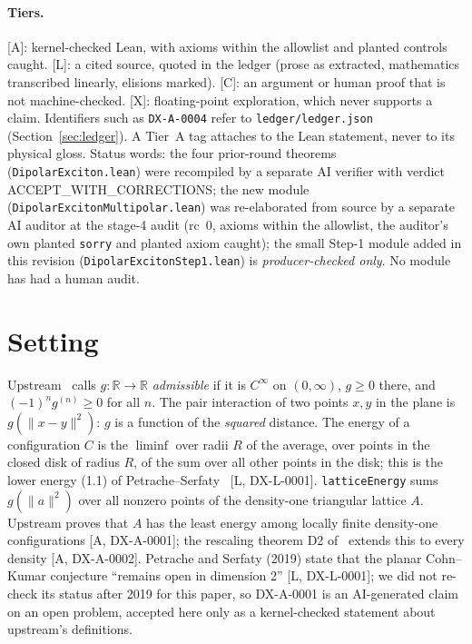 \documentclass[11pt]{article}
\theoremstyle{remark}
\newcommand{\R}{\mathbb{R}}
\newcommand{\tier}[1]{\textsf{[#1]}}
\newcommand{\lean}[1]{\texttt{#1}}
\begin{document}
\paragraph{Tiers.} \tier{A}: kernel-checked Lean, with axioms within the allowlist and planted controls caught.
\tier{L}: a cited source, quoted in the ledger (prose as extracted, mathematics transcribed linearly, elisions
marked). \tier{C}: an argument or human proof that is not
machine-checked. \tier{X}: floating-point exploration, which never supports a claim. Identifiers such as
\texttt{DX-A-0004} refer to \texttt{ledger/ledger.json} (Section~\ref{sec:ledger}). A Tier~A tag attaches to the Lean
statement, never to its physical gloss. Status words: the four prior-round theorems (\texttt{DipolarExciton.lean}) were
recompiled by a separate AI verifier with verdict ACCEPT\_WITH\_CORRECTIONS; the new module
(\texttt{DipolarExcitonMultipolar.lean}) was re-elaborated from source by a separate AI auditor at the stage-4 audit
(rc~0, axioms within the allowlist, the auditor's own planted \lean{sorry} and planted axiom caught); the small
Step-1 module added in this revision (\texttt{DipolarExcitonStep1.lean}) is \emph{producer-checked only}. No module
has had a human audit.

\section{Setting}\label{sec:setting}
Upstream~\cite{oai} calls $g:\R\to\R$ \emph{admissible} if it is $C^\infty$ on $(0,\infty)$, $g\ge0$ there, and
$(-1)^n g^{(n)}\ge0$ for all $n$. The pair interaction of two points $x,y$ in the plane is $g(\|x-y\|^2)$: $g$ is a
function of the \emph{squared} distance. The energy of a configuration $C$ is the $\liminf$ over radii $R$ of the
average, over points in the closed disk of radius $R$, of the sum over all other points in the disk; this is the lower
energy (1.1) of Petrache--Serfaty~\cite{ps} \tier{L, DX-L-0001}. \lean{latticeEnergy} sums $g(\|a\|^2)$ over all nonzero
points of the density-one triangular lattice $A$. Upstream proves that $A$ has the least energy among locally finite
density-one configurations \tier{A, DX-A-0001}; the rescaling theorem D2 of~\cite{d2} extends this to every density
\tier{A, DX-A-0002}. Petrache and Serfaty (2019) state that the planar Cohn--Kumar conjecture ``remains open in
dimension 2'' \tier{L, DX-L-0001}; we did not re-check its status after 2019 for this paper, so DX-A-0001 is an AI-generated claim on an open problem, accepted here only as a kernel-checked
statement about upstream's definitions.
\end{document}
